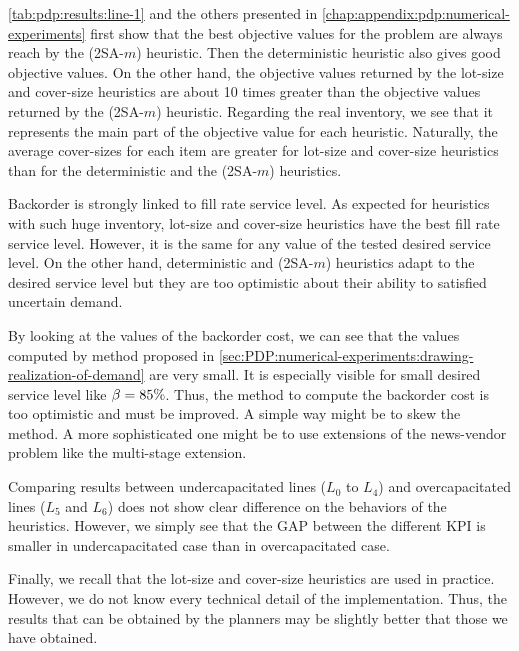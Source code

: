 \cref{tab:pdp:results:line-1} and the others presented in \cref{chap:appendix:pdp:numerical-experiments} first show that the best objective values for the problem are always reach by the (2SA-$m$) heuristic.
Then the deterministic heuristic also gives good objective values.
On the other hand, the objective values returned by the lot-size and cover-size heuristics are about 10 times greater than the objective values returned by the (2SA-$m$) heuristic.
Regarding the real inventory, we see that it represents the main part of the objective value for each heuristic.
Naturally, the average cover-sizes for each item are greater for lot-size and cover-size heuristics than for the deterministic and the (2SA-$m$) heuristics.


Backorder is strongly linked to fill rate service level.
As expected for heuristics with such huge inventory, lot-size and cover-size heuristics have the best fill rate service level.
However, it is the same for any value of the tested desired service level.
On the other hand, deterministic and (2SA-$m$) heuristics adapt to the desired service level but they are too optimistic about their ability to satisfied uncertain demand.


By looking at the values of the backorder cost, we can see that the values computed by method proposed in \cref{sec:PDP:numerical-experiments:drawing-realization-of-demand} are very small.
It is especially visible for small desired service level like $\beta=85\%$.
Thus, the method to compute the backorder cost is too optimistic and must be improved.
A simple way might be to skew the method.
A more sophisticated one might be to use extensions of the news-vendor problem like the multi-stage extension.


Comparing results between undercapacitated lines ($L_0$ to $L_4$) and overcapacitated lines ($L_5$ and $L_6$) does not show clear difference on the behaviors of the heuristics.
However, we simply see that the GAP between the different KPI is smaller in undercapacitated case than in overcapacitated case.


Finally, we recall that the lot-size and cover-size heuristics are used in practice.
However, we do not know every technical detail of the implementation.
Thus, the results that can be obtained by the planners may be slightly better that those we have obtained.




